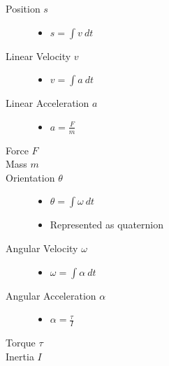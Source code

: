 \documentclass[a4paper]{article}
\begin{document}
\begin{description}
  \item[Position $s$] \hfill
    \begin{itemize}
      \item
        $s = \int v \: dt$

    \end{itemize}

  \item[Linear Velocity $v$] \hfill
    \begin{itemize}
      \item
        $v = \int a \: dt$

    \end{itemize}

  \item[Linear Acceleration $a$] \hfill
    \begin{itemize}
      \item
        $a = \frac{F}{m}$

    \end{itemize}

  \item[Force $F$] \hfill

  \item[Mass $m$] \hfill

  \item[Orientation $\theta$] \hfill
    \begin{itemize}
      \item
        $\theta = \int \omega \: dt$

      \item
        Represented as quaternion

    \end{itemize}

  \item[Angular Velocity $\omega$] \hfill
    \begin{itemize}
      \item
        $\omega = \int \alpha \: dt$

    \end{itemize}

  \item[Angular Acceleration $\alpha$] \hfill
    \begin{itemize}
      \item
        $\alpha = \frac{\tau}{I}$

    \end{itemize}

  \item[Torque $\tau$] \hfill

  \item[Inertia $I$] \hfill

\end{description}
\end{document}
